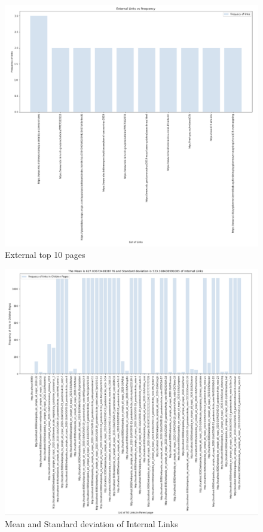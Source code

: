 \documentclass{resources/WeSTassignment}
\begin{document}
\begin{figure}[h]
    \centering
    \includegraphics[scale=0.5]{resources/external.png}
    \caption{External top 10 pages}  
    \label{fig:External top 10 pages}
\end{figure}
\begin{figure}[h]
    \centering
    \includegraphics[scale=0.5]{resources/children_internal.png}
    \caption{Mean and Standard deviation of Internal Links}  
    \label{fig:Mean and Standard deviation of Internal Links}
\end{figure}
\end{document}
